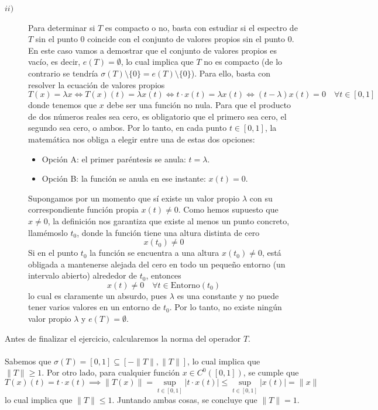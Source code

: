 \begin{ejercicio}
\begin{description}
        \item[$ii)$] Para determinar si $T$ es compacto o no, basta con estudiar si el espectro de $T$ sin el punto $0$ coincide con el conjunto de valores propios sin el punto $0$. En este caso vamos a demostrar que el conjunto de valores propios es vacío, es decir, $e(T) = \emptyset$, lo cual implica que $T$ no es compacto (de lo contrario se tendría $\sigma(T) \setminus \{0\} = e(T) \setminus \{0\}$). Para ello, basta con resolver la ecuación de valores propios 
        $$T(x) = \lambda x \iff T(x)(t) = \lambda x(t) \iff  t\cdot x(t) = \lambda x(t)\iff (t - \lambda) x(t) = 0 \quad \forall t\in [0,1]$$
        donde tenemos que $x$ debe ser una función no nula. Para que el producto de dos números reales sea cero, es obligatorio que el primero sea cero, el segundo sea cero, o ambos. Por lo tanto, en cada punto $t \in [0,1]$, la matemática nos obliga a elegir entre una de estas dos opciones:
        \begin{itemize}
            \item Opción A: el primer paréntesis se anula: $t = \lambda$.
            \item Opción B: la función se anula en ese instante: $x(t) = 0$.
        \end{itemize}
        Supongamos por un momento que sí existe un valor propio $\lambda$ con su correspondiente función propia $x(t) \neq 0$. Como hemos supuesto que $x \neq 0$, la definición nos garantiza que existe al menos un punto concreto, llamémoslo $t_0$, donde la función tiene una altura distinta de cero
        $$x(t_0) \neq 0$$
        Si en el punto $t_0$ la función se encuentra a una altura $x(t_0) \neq 0$, está obligada a mantenerse alejada del cero en todo un pequeño entorno (un intervalo abierto) alrededor de $t_0$, entonces
        $$x(t) \neq 0 \quad \forall t \in \text{Entorno}(t_0)$$
        lo cual es claramente un absurdo, pues $\lambda$ es una constante y no puede tener varios valores en un entorno de $t_0$. Por lo tanto, no existe ningún valor propio $\lambda$ y $e(T) = \emptyset$.
    \end{description}
    Antes de finalizar el ejercicio, calcularemos la norma del operador $T$.  \\ \\
    \noindent
    Sabemos que $\sigma(T) = [0,1] \subseteq [-\|T\|, \|T\|]$, lo cual implica que $\|T\| \geq 1$. Por otro lado, para cualquier función $x \in C^0([0,1])$, se cumple que
    \begin{equation*}
        T(x)(t) = t \cdot x(t) \implies \|T(x)\| = \sup_{t \in [0,1]} |t \cdot x(t)| \leq \sup_{t \in [0,1]} |x (t)| = \|x\|
    \end{equation*}
    lo cual implica que $\|T\| \leq 1$. Juntando ambas cosas, se concluye que $\|T\| = 1$.
\end{ejercicio}

